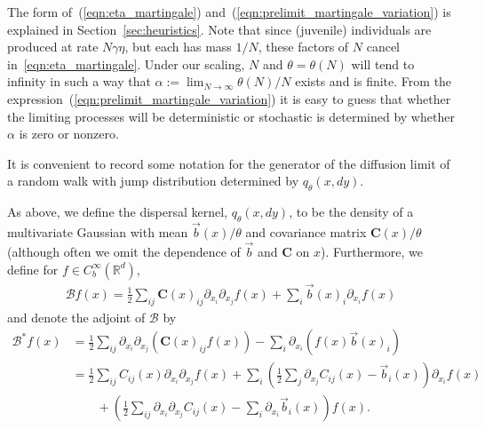 \documentclass[EJP]{ejpecp} %
\newcommand{\IR}{\mathbb R}
\newcommand{\DG}{\mathcal{B}}  %
\newcommand{\meanq}{\vec b}    %
\newcommand{\covq}{\mathbf{C}}     %
\begin{document}
The form of~(\ref{eqn:eta_martingale}) and~(\ref{eqn:prelimit_martingale_variation})
is explained in Section~\ref{sec:heuristics}.
Note that since (juvenile) individuals are produced at rate $N \gamma \eta$, but each
has mass $1/N$,
these factors of $N$ cancel in~\eqref{eqn:eta_martingale}. 
Under our scaling, $N$ and $\theta=\theta(N)$ will tend to infinity in such a 
way that $\alpha:=\lim_{N\to\infty}\theta(N)/N$ exists and is finite.
From the expression~(\ref{eqn:prelimit_martingale_variation}) it is easy to guess that 
whether the limiting processes will be deterministic or stochastic
is determined by whether $\alpha$ is zero or nonzero.


It is convenient to record some notation for the 
generator of the diffusion 
limit of a random walk with jump distribution determined by $q_\theta(x,dy)$.

\begin{definition}
    \label{def:dispersal_generator}
    As above, we define the dispersal kernel,
    $q_\theta(x, dy)$,
    to be the density of a multivariate Gaussian
    with mean $\meanq(x)/\theta$ and covariance matrix $\covq(x)/\theta$
    (although often we omit the dependence of $\meanq$ and $\covq$ on $x$).
    Furthermore, we define for $f \in C_b^\infty(\IR^d)$,
    \begin{align}
    \DG f(x)
        =
        \frac{1}{2} \sum_{ij} \covq(x)_{ij} \partial_{x_i} \partial_{x_j} f(x)
        + \sum_i \meanq(x)_i \partial_{x_i} f(x)
    \end{align}
    and denote the adjoint of $\DG$ by
    \begin{align*}
    \DG^* f(x)
        &=
        \frac{1}{2} \sum_{ij} \partial_{x_i} \partial_{x_j} (\covq(x)_{ij} f(x))
        - \sum_i \partial_{x_i} (f(x) \meanq(x)_i) 
        \\
        &=
        \frac{1}{2} \sum_{ij} C_{ij}(x) \partial_{x_i} \partial_{x_j} f(x)
        + \sum_i \left(
            \frac{1}{2} \sum_j \partial_{x_j} C_{ij}(x) - \meanq_i(x)
        \right) \partial_{x_i} f(x)
        \\ & \qquad {}
        + \left(
            \frac{1}{2} \sum_{ij} \partial_{x_i} \partial_{x_j} C_{ij}(x)
            -
            \sum_i \partial_{x_i} \meanq_i(x)
        \right) f(x) .
    \end{align*}
\end{definition}
\end{document}
